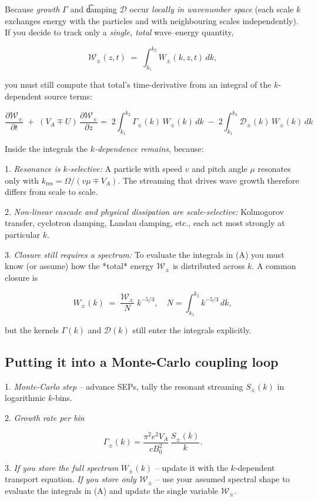 Because {\it growth} $\Gamma$ and {\t damping} $\mathcal D$ occur {\it locally in wavenumber space} (each scale $k$ exchanges energy with the particles and with neighbouring scales independently). If you decide to track only a {\it single, total} wave–energy quantity,

$$
\mathcal W_\pm(z,t)\;=\;\int_{k_1}^{k_2} W_\pm(k,z,t)\,dk ,
$$

you must still compute that total’s time-derivative from an integral of the $k$-dependent source terms:

$$
\frac{\partial \mathcal W_\pm}{\partial t}
\;+\;(V_A\!\mp\!U)\,\frac{\partial \mathcal W_\pm}{\partial z}
=\;2\!\int_{k_1}^{k_2}\!\Gamma_\pm(k)\,W_\pm(k)\,dk
\;-\;2\!\int_{k_1}^{k_2}\!\mathcal D_\pm(k)\,W_\pm(k)\,dk 
$$

Inside the integrals the {\it $k$-dependence remains}, because:

1. {\it Resonance is $k$-selective:}
   A particle with speed $v$ and pitch angle $\mu$ resonates only with
   $k_{\text{res}} = \Omega /(v\mu \mp V_A)$.
   The streaming that drives wave growth therefore differs from scale to scale.

2. {\it Non-linear cascade and physical dissipation are scale-selective:}
   Kolmogorov transfer, cyclotron damping, Landau damping, etc., each act most strongly at particular $k$.

3. {\it Closure still requires a spectrum:}
   To evaluate the integrals in (A) you must know (or assume) how the *total* energy $\mathcal W_\pm$ is distributed across $k$.
   A common closure is

   $$
   W_\pm(k) \;=\; \frac{\mathcal W_\pm}{N}\;k^{-5/3},
   \quad
   N=\!\!\int_{k_1}^{k_2}\!k^{-5/3}\,dk ,
   $$

   but the kernels $\Gamma(k)$ and $\mathcal D(k)$ still enter the integrals explicitly.

\subsection{Putting it into a Monte-Carlo coupling loop}

1. {\it Monte-Carlo step} – advance SEPs, tally the resonant streaming $S_\pm(k)$ in logarithmic $k$-bins.

2. {\it Growth rate per bin} 

   $$
   \Gamma_\pm(k)=\frac{\pi^2 e^2 V_A}{cB_0^2}\,\frac{S_\pm(k)}{k}.
   $$

3. {\it If you store the full spectrum} $W_\pm(k)$
   – update it with the $k$-dependent transport equation.
   {\it If you store only $\mathcal W_\pm$}
   – use your assumed spectral shape to evaluate the integrals in (A) and update the single variable $\mathcal W_\pm$.





